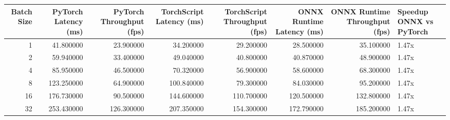 \begin{tabular}{rrrrrrrl}
\toprule
Batch Size & PyTorch Latency (ms) & PyTorch Throughput (fps) & TorchScript Latency (ms) & TorchScript Throughput (fps) & ONNX Runtime Latency (ms) & ONNX Runtime Throughput (fps) & Speedup ONNX vs PyTorch \\
\midrule
1 & 41.800000 & 23.900000 & 34.200000 & 29.200000 & 28.500000 & 35.100000 & 1.47x \\
2 & 59.940000 & 33.400000 & 49.040000 & 40.800000 & 40.870000 & 48.900000 & 1.47x \\
4 & 85.950000 & 46.500000 & 70.320000 & 56.900000 & 58.600000 & 68.300000 & 1.47x \\
8 & 123.250000 & 64.900000 & 100.840000 & 79.300000 & 84.030000 & 95.200000 & 1.47x \\
16 & 176.730000 & 90.500000 & 144.600000 & 110.700000 & 120.500000 & 132.800000 & 1.47x \\
32 & 253.430000 & 126.300000 & 207.350000 & 154.300000 & 172.790000 & 185.200000 & 1.47x \\
\bottomrule
\end{tabular}
